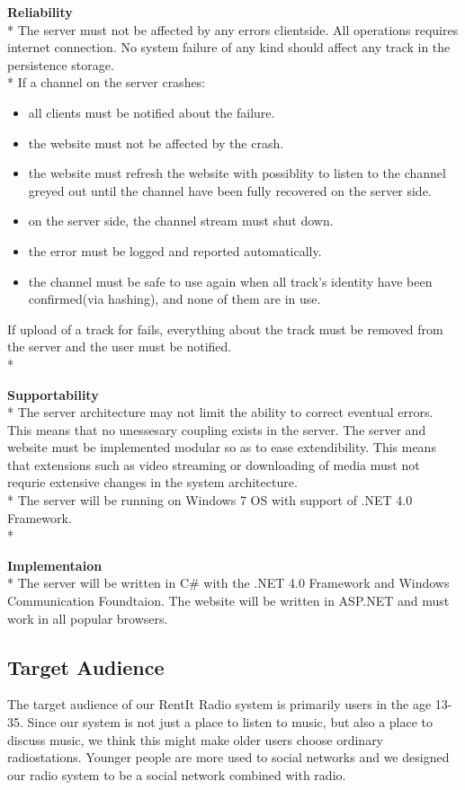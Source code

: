 \documentclass[a4paper,11pt,report]{article}
\begin{document}
\textbf{Reliability} \\*
The server must not be affected by any errors clientside. All operations requires internet connection. No system failure of any kind should affect any track in the persistence storage. \\*
If a channel on the server crashes:
\begin{itemize}
\item all clients must be notified about the failure.
\item the website must not be affected by the crash.
\item the website must refresh the website with possiblity to listen to the channel greyed out until the channel have been fully recovered on the server side.
\item on the server side, the channel stream must shut down.
\item the error must be logged and reported automatically. 
\item the channel must be safe to use again when all track's identity have been confirmed(via hashing), and none of them are in use.
\end{itemize}
If upload of a track for fails, everything about the track must be removed from the server and the user must be notified. \\*

\textbf{Supportability} \\*
The server architecture may not limit the ability to correct eventual errors. This means that no unessesary coupling exists in the server.
The server and website must be implemented modular so as to ease extendibility.
This means that extensions such as video streaming or downloading of media must not requrie extensive changes in the system architecture. \\*
The server will be running on Windows 7 OS with support of .NET 4.0 Framework.\\*

\textbf{Implementaion} \\*
The server will be written in C\# with the .NET 4.0 Framework and Windows Communication Foundtaion.
The website will be written in ASP.NET and must work in all popular browsers.

\subsection{Target Audience}
The target audience of our RentIt Radio system is primarily users in the age 13-35. Since our system is not just a place to listen to music, but also a place to discuss music, we think this might make older users choose ordinary radiostations. Younger people are more used to social networks and we designed our radio system to be a social network combined with radio.
\end{document}
